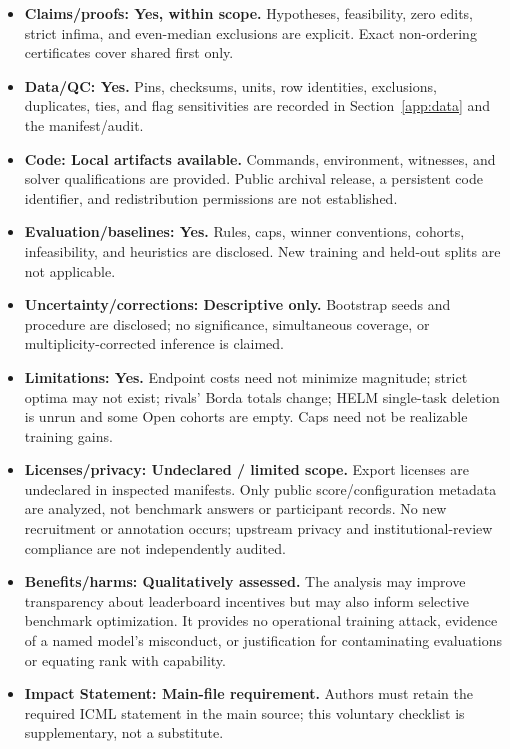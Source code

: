 \begin{itemize}
 \setlength{\itemsep}{1pt}
 \item \textbf{Claims/proofs: Yes, within scope.} Hypotheses, feasibility, zero edits, strict infima, and even-median exclusions are explicit. Exact non-ordering certificates cover shared first only.
 \item \textbf{Data/QC: Yes.} Pins, checksums, units, row identities, exclusions, duplicates, ties, and flag sensitivities are recorded in Section~\ref{app:data} and the manifest/audit.
 \item \textbf{Code: Local artifacts available.} Commands, environment, witnesses, and solver qualifications are provided. Public archival release, a persistent code identifier, and redistribution permissions are not established.
 \item \textbf{Evaluation/baselines: Yes.} Rules, caps, winner conventions, cohorts, infeasibility, and heuristics are disclosed. New training and held-out splits are not applicable.
 \item \textbf{Uncertainty/corrections: Descriptive only.} Bootstrap seeds and procedure are disclosed; no significance, simultaneous coverage, or multiplicity-corrected inference is claimed.
 \item \textbf{Limitations: Yes.} Endpoint costs need not minimize magnitude; strict optima may not exist; rivals' Borda totals change; HELM single-task deletion is unrun and some Open cohorts are empty. Caps need not be realizable training gains.
 \item \textbf{Licenses/privacy: Undeclared / limited scope.} Export licenses are undeclared in inspected manifests. Only public score/configuration metadata are analyzed, not benchmark answers or participant records. No new recruitment or annotation occurs; upstream privacy and institutional-review compliance are not independently audited.
 \item \textbf{Benefits/harms: Qualitatively assessed.} The analysis may improve transparency about leaderboard incentives but may also inform selective benchmark optimization. It provides no operational training attack, evidence of a named model's misconduct, or justification for contaminating evaluations or equating rank with capability.
 \item \textbf{Impact Statement: Main-file requirement.} Authors must retain the required ICML statement in the main source; this voluntary checklist is supplementary, not a substitute.
\end{itemize}
